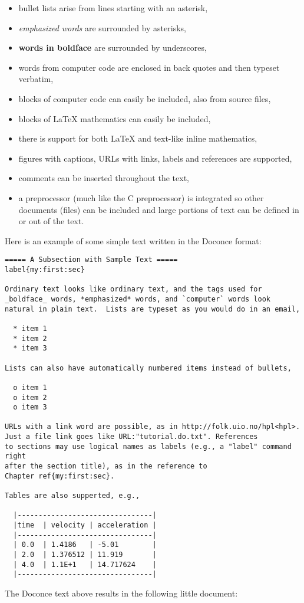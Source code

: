\documentclass{article}
\begin{document}
\begin{itemize}
  \item bullet lists arise from lines starting with an asterisk,
  \item \emph{emphasized words} are surrounded by asterisks, 
  \item \textbf{words in boldface} are surrounded by underscores, 
  \item words from computer code are enclosed in back quotes and 
    then typeset verbatim,
  \item blocks of computer code can easily be included, also from source files,
  \item blocks of {\LaTeX} mathematics can easily be included,
  \item there is support for both {\LaTeX} and text-like inline mathematics,
  \item figures with captions, URLs with links, labels and references
    are supported,
  \item comments can be inserted throughout the text,
  \item a preprocessor (much like the C preprocessor) is integrated so
    other documents (files) can be included and large portions of text
    can be defined in or out of the text.
\end{itemize}
Here is an example of some simple text written in the Doconce format:
\begin{Verbatim}[fontsize=\fontsize{9pt}{9pt},tabsize=8,baselinestretch=0.85,
fontfamily=tt,xleftmargin=7mm]
===== A Subsection with Sample Text =====
label{my:first:sec}

Ordinary text looks like ordinary text, and the tags used for
_boldface_ words, *emphasized* words, and `computer` words look
natural in plain text.  Lists are typeset as you would do in an email,

  * item 1
  * item 2
  * item 3

Lists can also have automatically numbered items instead of bullets,

  o item 1
  o item 2
  o item 3

URLs with a link word are possible, as in http://folk.uio.no/hpl<hpl>.
Just a file link goes like URL:"tutorial.do.txt". References
to sections may use logical names as labels (e.g., a "label" command right
after the section title), as in the reference to 
Chapter ref{my:first:sec}.

Tables are also supperted, e.g.,

  |--------------------------------|
  |time  | velocity | acceleration |
  |--------------------------------|
  | 0.0  | 1.4186   | -5.01        |
  | 2.0  | 1.376512 | 11.919       |
  | 4.0  | 1.1E+1   | 14.717624    |
  |--------------------------------|
\end{Verbatim}
\noindent
The Doconce text above results in the following little document:
\end{document}
